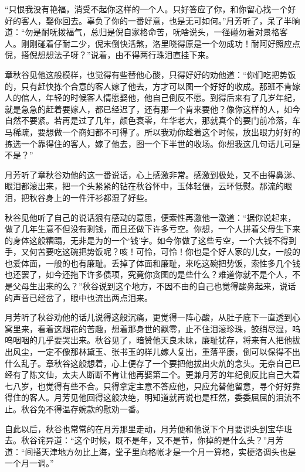 \documentclass[12pt,UTF8]{ctexbook}
\begin{document}
{{{“只恨我没有艳福，消受不起你这样的一个人。只好答应了你，和你留心找一个好好的客人，娶你回去。辜负了你的一番好意，也是无可如何。”月芳听了，呆了半晌道：“勿是耐呒拨福气，总归是倪自家格命苦，呒啥说头，一径碰勿着对景格客人。刚刚碰着仔耐二少，倪末倒快活煞，洛里晓得原是一个勿成功！耐阿好照应点倪，搭倪想想法子呀？”说着，由不得两行珠泪直挂下来。

章秋谷见他这般模样，也觉得有些替他心酸，只得好好的劝他道：“你们吃把势饭的，只有赶快拣个合意的客人嫁了他去，方才可以图一个好好的收成。那班不肯嫁人的倌人，年轻的时候客人情愿娶他，他自己倒反不愿。到得后来有了几岁年纪，就是急急的赶着要嫁人，都已经迟了，还有那一个肯来要他？像你这样的人，如今自然不要紧。若再是过了几年，颜色衰零，年华老大，那就真个的要门前冷落，车马稀疏，要想做一个商妇都不可得了。所以我劝你趁着这个时候，放出眼力好好的拣选一个靠得住的客人，嫁了他去，图一个下半世的收场。你想我这几句话儿可是不是？”

月芳听了章秋谷劝他的这一番说话，心上感激非常。感激到极处，又不由得鼻涕、眼泪都滚出来，把一个头紧紧的钻在秋谷怀中，玉体轻偎，云环低熨。那流的眼泪，把秋谷身上的一件汗衫都湿了好些。

秋谷见他听了自己的说话狠有感动的意思，便索性再激他一激道：“据你说起来，做了几年生意不但没有剩钱，而且还做下许多亏空。你想，一个人拼着父母生下来的身体这般糟蹋，无非是为的一个‘钱’字。如今你做了这些亏空，一个大钱不得到手，又何苦要吃这碗把势饭呢？咳！可怜，可怜！你也是个好人家的儿女，一般的也爱体面，一般的也有廉耻。丢掉了体面和廉耻，来吃这碗把势饭，索性多几个钱也还罢了，如今还拖下许多债项，究竟你贪图的是些什么？难道你就不是个人，不是父母生出来的么？”秋谷说到这个地方，不因不由的自己也觉得酸鼻起来，说话的声音已经岔了，眼中也流出两点泪来。

月芳听了秋谷劝他的话儿说得这般沉痛，更觉得一阵心酸，从肚子底下一直透到心窝里来，看着这烟花的苦趣，想着那身世的飘零，止不住泪滚珍珠，鲛绡尽湿，呜呜咽咽的几乎要哭出来。秋谷见了，暗赞他天良未昧，廉耻犹存，将来有人把他拔出风尘，一定不像那林黛玉、张书玉的样儿嫁人复出，重落平康，倒可以保得不出什么乱子。章秋谷这般想着，心上便存了一个要把他拔出火炕的念头。无奈自己已经有了陈文仙，太夫人断断不肯让他再娶第二个。更兼月芳的年纪倒反比自己大着七八岁，也觉得有些不合。只得拿定主意不答应他，只应允替他留意，寻个好好靠得住的客人。月芳见他回得这般决绝，明知道就再说也是枉然，委委屈屈的泪流不止。秋谷免不得温存婉款的慰劝一番。

自此以后，秋谷也常常的在月芳那里走动，月芳便和他说下个月要调头到宝华班去。秋谷诧异道：“这个时候，既不是年，又不是节，你掉的是什么头？”月芳道：“间搭天津地方勿比上海，堂子里向格帐才是一个月一算格，实梗洛调头也是一个月一调。”

}}}
\end{document}
